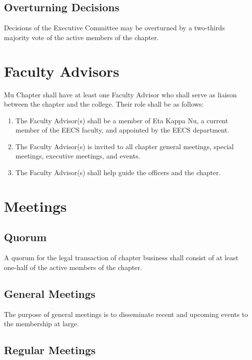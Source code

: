 \documentclass[11pt]{article}
\begin{document}
\subsection{Overturning Decisions}
\label{sec:org4a3af74}

Decisions of the Executive Committee may be overturned by a two-thirds majority vote of the active members of the chapter.
\section{Faculty Advisors}
\label{sec:org1a8b091}

Mu Chapter shall have at least one Faculty Advisor who shall serve as liaison between the chapter and the college.
Their role shall be as follows:

\begin{enumerate}
\item The Faculty Advisor(s) shall be a member of Eta Kappa Nu, a current member of the EECS faculty, and appointed by the EECS department.
\item The Faculty Advisor(s) is invited to all chapter general meetings, special meetings, executive meetings, and events.
\item The Faculty Advisor(s) shall help guide the officers and the chapter.
\end{enumerate}
\section{Meetings}
\label{sec:orgcbf80e5}

\subsection{Quorum}
\label{sec:org00d1843}

A quorum for the legal transaction of chapter business shall consist of at least one-half of the active members of the chapter.

\subsection{General Meetings}
\label{sec:org515ac86}

The purpose of general meetings is to disseminate recent and upcoming events to the membership at large.

\subsection{Regular Meetings}
\label{sec:orgbed2e66}
\end{document}
